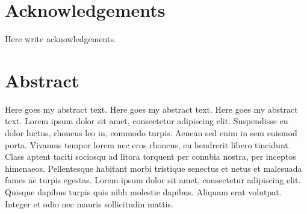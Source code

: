 \documentclass[
  12pt,
  a4paper,
  openany]{scrbook}
\renewcommand*\contentsname{Table of contents}
\newcommand\contentsname{Table of contents}
\renewcommand*\listfigurename{List of Figures}
\newcommand\listfigurename{List of Figures}
\renewcommand*\listtablename{List of Tables}
\newcommand\listtablename{List of Tables}
\begin{document}
% 
% 
% 

\let\mainmatterreal\mainmatter
\let\mainmatter\relax

\renewcommand*\contentsname{Table of contents}
\renewcommand*\listfigurename{List of figures}
\renewcommand*\listtablename{List of tables}

\mainmatter
{}

\chapter*{Acknowledgements}\label{acknowledgements}


Here write acknowledgements.


\chapter*{Abstract}\label{abstract}


Here goes my abstract text. Here goes my abstract text. Here goes my
abstract text. Lorem ipsum dolor sit amet, consectetur adipiscing elit.
Suspendisse eu dolor luctus, rhoncus leo in, commodo turpis. Aenean sed
enim in sem euismod porta. Vivamus tempor lorem nec eros rhoncus, eu
hendrerit libero tincidunt. Class aptent taciti sociosqu ad litora
torquent per conubia nostra, per inceptos himenaeos. Pellentesque
habitant morbi tristique senectus et netus et malesuada fames ac turpis
egestas. Lorem ipsum dolor sit amet, consectetur adipiscing elit.
Quisque dapibus turpis quis nibh molestie dapibus. Aliquam erat
volutpat. Integer et odio nec mauris sollicitudin mattis.
\end{document}
